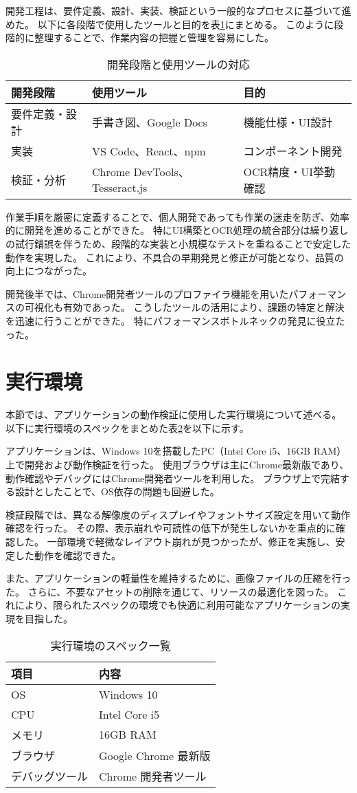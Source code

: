 \documentclass[main]{subfiles}
\begin{document}
開発工程は、要件定義、設計、実装、検証という一般的なプロセスに基づいて進めた。  
以下に各段階で使用したツールと目的を表\ref{tab:dev_phases}にまとめる。  
このように段階的に整理することで、作業内容の把握と管理を容易にした。

\begin{table}[htbp]
\centering
\caption{開発段階と使用ツールの対応}
\label{tab:dev_phases}
\begin{tabular}{lll}
\hline
開発段階 & 使用ツール & 目的 \\
\hline
要件定義・設計 & 手書き図、Google Docs & 機能仕様・UI設計 \\
実装 & VS Code、React、npm & コンポーネント開発 \\
検証・分析 & Chrome DevTools、Tesseract.js & OCR精度・UI挙動確認 \\
\hline
\end{tabular}
\end{table}

作業手順を厳密に定義することで、個人開発であっても作業の迷走を防ぎ、効率的に開発を進めることができた。  
特にUI構築とOCR処理の統合部分は繰り返しの試行錯誤を伴うため、段階的な実装と小規模なテストを重ねることで安定した動作を実現した。  
これにより、不具合の早期発見と修正が可能となり、品質の向上につながった。

開発後半では、Chrome開発者ツールのプロファイラ機能を用いたパフォーマンスの可視化も有効であった。  
こうしたツールの活用により、課題の特定と解決を迅速に行うことができた。  
特にパフォーマンスボトルネックの発見に役立たった。
\section{実行環境}
本節では、アプリケーションの動作検証に使用した実行環境について述べる。
以下に実行環境のスペックをまとめた表\ref{tab:execution_environment}を以下に示す。

アプリケーションは、Windows 10を搭載したPC（Intel Core i5、16GB RAM）上で開発および動作検証を行った。  
使用ブラウザは主にChrome最新版であり、動作確認やデバッグにはChrome開発者ツールを利用した。  
ブラウザ上で完結する設計としたことで、OS依存の問題も回避した。

検証段階では、異なる解像度のディスプレイやフォントサイズ設定を用いて動作確認を行った。
その際、表示崩れや可読性の低下が発生しないかを重点的に確認した。
一部環境で軽微なレイアウト崩れが見つかったが、修正を実施し、安定した動作を確認できた。

また、アプリケーションの軽量性を維持するために、画像ファイルの圧縮を行った。
さらに、不要なアセットの削除を通じて、リソースの最適化を図った。
これにより、限られたスペックの環境でも快適に利用可能なアプリケーションの実現を目指した。

\begin{table}[htbp]
\centering
\caption{実行環境のスペック一覧}
\label{tab:execution_environment}
\begin{tabular}{ll}
\hline
項目 & 内容 \\
\hline
OS & Windows 10 \\
CPU & Intel Core i5 \\
メモリ & 16GB RAM \\
ブラウザ & Google Chrome 最新版 \\
デバッグツール & Chrome 開発者ツール \\
\hline
\end{tabular}
\end{table}
\end{document}
